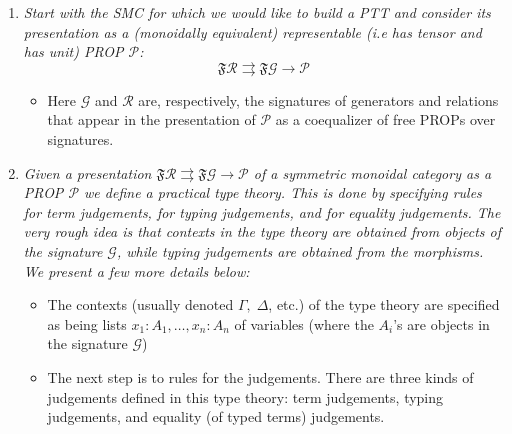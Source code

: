 \documentclass[pra,floatfix,
amsmath,superscriptaddress, 12pt]{article}
\theoremstyle{definition}
\newcommand{\cG}{\mathcal{G}}
\newcommand{\cR}{\mathcal{R}}
\newcommand{\mc}[1]{\mathcal{#1}}
\begin{document}
\begin{enumerate}
    \item \textit{Start with the SMC for which we would like to build a PTT and consider its presentation as a (monoidally equivalent) representable (i.e has tensor and has unit) PROP $\mc{P}$:}
        \[
        \mathfrak{F}\mc{R} \rightrightarrows \mathfrak{F}\mc{G} \rightarrow \mc{P}
    \]
    \begin{itemize}
        \item Here $\cG$ and $\cR$ are, respectively, the signatures of generators and relations that appear in the presentation of $\mc{P}$ as a coequalizer of free PROPs over signatures.
    \end{itemize}
    
    
    \item \textit{Given a presentation $\mathfrak{F}\mathcal{R} \rightrightarrows\mathfrak{F}\mathcal{G}\rightarrow \mc{P}$
 of a symmetric monoidal category as a PROP $\mc{P}$ we define a practical type theory. This is done by specifying rules for term judgements, for typing judgements, and for equality judgements. The very rough idea is that contexts in the type theory are obtained from objects of the signature $\mc{G}$, while typing judgements are obtained from the morphisms. We present a few more details below:}
 \begin{itemize}
    \item %
    The contexts (usually denoted $\Gamma,\;\Delta$, etc.) of the type theory are specified as being lists $x_{1}:A_{1},\dots,x_{n}:A_{n}$ of variables (where the $A_i$'s are objects in the signature $\cG$)
    \item The next step is to rules for the judgements. There are three kinds of judgements defined in this type theory: term judgements, typing judgements, and equality (of typed terms) judgements. 
    

\end{itemize}
\end{enumerate}
\end{document}
